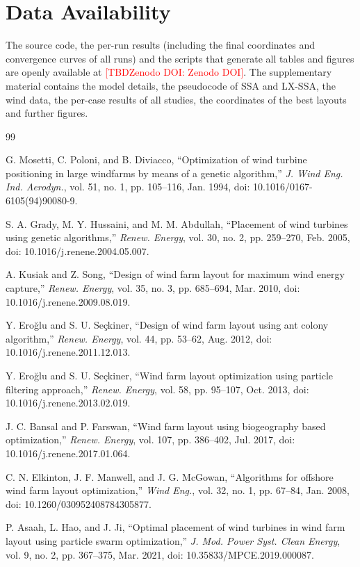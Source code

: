\documentclass[journal,twoside]{IEEEtran}
\newcommand{\TBD}[1]{\textcolor{red}{[TBD\ifx\relax#1\relax\else: #1\fi]}}
\begin{document}
\section*{Data Availability}
The source code, the per-run results (including the final coordinates and convergence curves of all runs) and the scripts that generate all tables and figures are openly available at \TBD{Zenodo DOI}. The supplementary material contains the model details, the pseudocode of SSA and LX-SSA, the wind data, the per-case results of all studies, the coordinates of the best layouts and further figures.

\begin{thebibliography}{99}

G. Mosetti, C. Poloni, and B. Diviacco, ``Optimization of wind turbine positioning in large windfarms by means of a genetic algorithm,'' \textit{J. Wind Eng. Ind. Aerodyn.}, vol. 51, no. 1, pp. 105--116, Jan. 1994, doi: 10.1016/0167-6105(94)90080-9.

S. A. Grady, M. Y. Hussaini, and M. M. Abdullah, ``Placement of wind turbines using genetic algorithms,'' \textit{Renew. Energy}, vol. 30, no. 2, pp. 259--270, Feb. 2005, doi: 10.1016/j.renene.2004.05.007.

A. Kusiak and Z. Song, ``Design of wind farm layout for maximum wind energy capture,'' \textit{Renew. Energy}, vol. 35, no. 3, pp. 685--694, Mar. 2010, doi: 10.1016/j.renene.2009.08.019.

Y. Ero\u{g}lu and S. U. Se\c{c}kiner, ``Design of wind farm layout using ant colony algorithm,'' \textit{Renew. Energy}, vol. 44, pp. 53--62, Aug. 2012, doi: 10.1016/j.renene.2011.12.013.

Y. Ero\u{g}lu and S. U. Se\c{c}kiner, ``Wind farm layout optimization using particle filtering approach,'' \textit{Renew. Energy}, vol. 58, pp. 95--107, Oct. 2013, doi: 10.1016/j.renene.2013.02.019.

J. C. Bansal and P. Farswan, ``Wind farm layout using biogeography based optimization,'' \textit{Renew. Energy}, vol. 107, pp. 386--402, Jul. 2017, doi: 10.1016/j.renene.2017.01.064.

C. N. Elkinton, J. F. Manwell, and J. G. McGowan, ``Algorithms for offshore wind farm layout optimization,'' \textit{Wind Eng.}, vol. 32, no. 1, pp. 67--84, Jan. 2008, doi: 10.1260/030952408784305877.

P. Asaah, L. Hao, and J. Ji, ``Optimal placement of wind turbines in wind farm layout using particle swarm optimization,'' \textit{J. Mod. Power Syst. Clean Energy}, vol. 9, no. 2, pp. 367--375, Mar. 2021, doi: 10.35833/MPCE.2019.000087.


\end{thebibliography}
\end{document}
